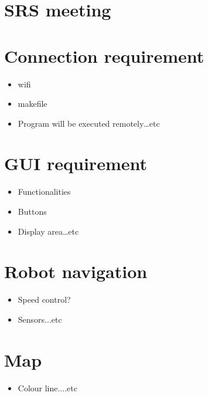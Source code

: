 \documentclass[11pt, a4paper]{article}
\begin{document}
	
	\section{SRS meeting}
	
	\section{Connection requirement}
	\begin{itemize}
	\item wifi
	\item makefile
	\item Program will be executed remotely…etc
	\end{itemize}
	
	\section{GUI requirement}
	\begin{itemize}
		\item Functionalities
		\item Buttons
		\item Display area…etc
	\end{itemize}
	
	\section{Robot navigation}
	\begin{itemize}
	\item Speed control?
	\item Sensors...etc
	\end{itemize}
	
	\section {Map}
	\begin{itemize}
	\item Colour line....etc
	\end{itemize}

	
\end{document}
